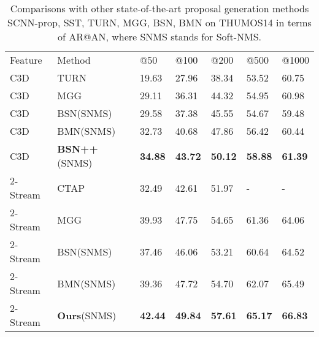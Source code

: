 \documentclass[letterpaper]{article} \usepackage{aaai21}  \usepackage{times}  \usepackage{helvet} \usepackage{courier}  \usepackage[hyphens]{url}  \usepackage{graphicx} \urlstyle{rm} \def\UrlFont{\rm}  \usepackage{natbib}  \usepackage{amsmath,amssymb} \usepackage{caption} \frenchspacing  \usepackage{color}
\begin{document}
\setlength{\tabcolsep}{4pt}
\begin{table}[tbp]
\centering
	\caption{Comparisons with other state-of-the-art proposal generation methods SCNN-prop\cite{SCNN}, SST\cite{sst_buch_cvpr17}, TURN\cite{gao2017turn}, MGG\cite{LiuMulti}, BSN\cite{BSN}, BMN\cite{LinBMN}  on THUMOS14 in terms of AR@AN, where SNMS stands for Soft-NMS.}
	\small
	\begin{tabular}{m{1.3cm}m{2cm}m{0.6cm}m{0.6cm}m{0.6cm}m{0.6cm}m{0.8cm}}
		\toprule
		Feature & Method  & @50  & @100 & @200 & @500 & @1000    \\
		\noalign{\smallskip}
		\hline
		\noalign{\smallskip}
C3D & TURN & 19.63 & 27.96 & 38.34 & 53.52 & 60.75  \\
		C3D & MGG  & 29.11 & 36.31 & 44.32 & 54.95 & 60.98 \\
		C3D & BSN(SNMS) & 29.58 & 37.38 & 45.55 & 54.67 & 59.48 \\ 
		C3D & BMN(SNMS) & 32.73 & 40.68 & 47.86 & 56.42 & 60.44 \\
		\noalign{\smallskip}
		\hline
		\noalign{\smallskip}
		C3D & \textbf{BSN++}(SNMS) & \textbf{34.88}  & \textbf{43.72} & \textbf{50.12}  & \textbf{58.88} & \textbf{61.39}\\
		\noalign{\smallskip}
		\hline
		\hline
		\noalign{\smallskip}
2-Stream & CTAP & 32.49 & 42.61 & 51.97 & - & - \\
		2-Stream & MGG & 39.93 & 47.75 & 54.65 & 61.36 & 64.06 \\
		2-Stream & BSN(SNMS)& 37.46 & 46.06 & 53.21 & 60.64 & 64.52 \\
		2-Stream & BMN(SNMS)& 39.36 & 47.72 & 54.70 & 62.07 & 65.49 \\
		\noalign{\smallskip}
		\hline
		\noalign{\smallskip}
		2-Stream & \textbf{Ours}(SNMS) & \textbf{42.44} & \textbf{49.84} & \textbf{57.61} & \textbf{65.17} & \textbf{66.83}   \\
		\bottomrule
	\end{tabular}
	\label{table_proposal_thumos}
\end{table}
\end{document}
